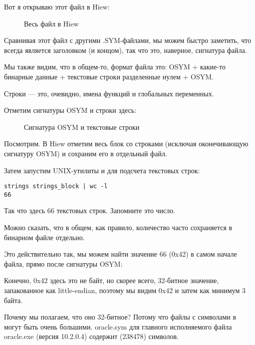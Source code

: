 \clearpage
Вот я открываю этот файл в Hiew:

\begin{figure}[H]
\centering
{}
\caption{Весь файл в Hiew}
\label{fig:oracle_SYM_whole1}
\end{figure}

Сравнивая этот файл с другими .SYM-файлами, мы можем быстро заметить, что  всегда является
заголовком (и концом), так что это, наверное, сигнатура файла.

Мы также видим, что в общем-то, формат файла это: OSYM + какие-то бинарные данные + 
текстовые строки разделенные нулем + OSYM.

Строки --- это, очевидно, имена функций и глобальных переменных.

\clearpage
Отметим сигнатуры OSYM и строки здесь: 

\begin{figure}[H]
\centering
{}
\caption{Сигнатура OSYM и текстовые строки}
\label{fig:oracle_SYM_whole2}
\end{figure}

Посмотрим. 
В Hiew отметим весь блок со строками (исключая оконечивающую сигнатуру OSYM) и сохраним его в отдельный
файл.

Затем запустим UNIX-утилиты  и  для подсчета текстовых строк:%

\begin{lstlisting}
strings strings_block | wc -l
66
\end{lstlisting}

Так что здесь 66 текстовых строк.  Запомните это число.

Можно сказать, что в общем, как правило, количество  часто сохраняется в бинарном
файле отдельно.

Это действительно так, мы можем найти значение 66 (0x42) в самом начале файла, прямо после сигнатуры OSYM:



Конечно, 0x42 здесь это не байт, но скорее всего, 32-битное значение, запакованное как little-endian,
поэтому мы видим 0x42 и затем как минимум 3 байта.

Почему мы полагаем, что оно 32-битное?
Потому что файлы с символами в \oracle могут быть очень большими.
oracle.sym для главного исполняемого файла oracle.exe (версия 10.2.0.4) содержит  (238478) 
символов.

